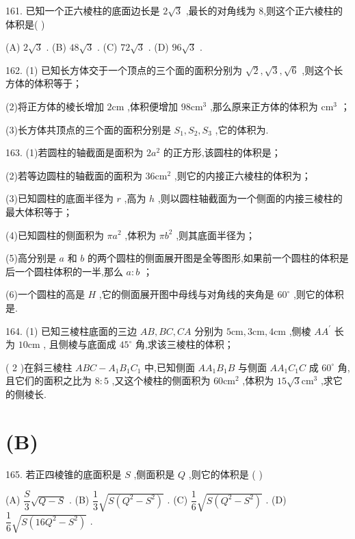 161. 已知一个正六棱柱的底面边长是 $2\sqrt{3}$ ,最长的对角线为 8,则这个正六棱柱的体积是(   )

(A) $2\sqrt{3}$ . (B) ${48}\sqrt{3}$ . (C) ${72}\sqrt{3}$ . (D) ${96}\sqrt{3}$ .

162. (1) 已知长方体交于一个顶点的三个面的面积分别为 $\sqrt{2},\sqrt{3},\sqrt{6}$ ,则这个长方体的体积等于\blkda{}；

(2)将正方体的棱长增加 $2\mathrm{{cm}}$ ,体积便增加 ${98}{\mathrm{{cm}}}^{3}$ ,那么原来正方体的体积为\blkda{} ${\mathrm{{cm}}}^{3}$ ；

(3)长方体共顶点的三个面的面积分别是 ${S}_{1},{S}_{2},{S}_{3}$ ,它的体积为\blkda{}.

163. (1)若圆柱的轴截面是面积为 $2{a}^{2}$ 的正方形,该圆柱的体积是\blkda{}；

(2)若等边圆柱的轴截面的面积为 ${36}{\mathrm{{cm}}}^{2}$ ,则它的内接正六棱柱的体积为\blkda{}；

(3)已知圆柱的底面半径为 $r$ ,高为 $h$ ,则以圆柱轴截面为一个侧面的内接三棱柱的最大体积等于\blkda{}；

(4)已知圆柱的侧面积为 $\pi {a}^{2}$ ,体积为 $\pi {b}^{2}$ ,则其底面半径为\blkda{}；

(5)高分别是 $a$ 和 $b$ 的两个圆柱的侧面展开图是全等图形,如果前一个圆柱的体积是后一个圆柱体积的一半,那么 $a : b$ \blkda{}；

(6)一个圆柱的高是 $H$ ,它的侧面展开图中母线与对角线的夹角是 ${60}^{ \circ  }$ ,则它的体积是\blkda{}.

164. (1) 已知三棱柱底面的三边 ${AB},{BC},{CA}$ 分别为 $5\mathrm{{cm}},3\mathrm{{cm}},4\mathrm{{cm}}$ ,侧棱 $A{A}^{\prime }$ 长为 ${10}\mathrm{{cm}}$ , 且侧棱与底面成 ${45}^{ \circ  }$ 角,求该三棱柱的体积；

( 2 )在斜三棱柱 ${ABC} - {A}_{1}{B}_{1}{C}_{1}$ 中,已知侧面 $A{A}_{1}{B}_{1}B$ 与侧面 $A{A}_{1}{C}_{1}C$ 成 ${60}^{ \circ  }$ 角,且它们的面积之比为 $8 : 5$ ,又这个棱柱的侧面积为 ${60}{\mathrm{{cm}}}^{2}$ ,体积为 ${15}\sqrt{3}{\mathrm{{cm}}}^{3}$ ,求它的侧棱长.

\section*{(B)}

165. 若正四棱锥的底面积是 $S$ ,侧面积是 $Q$ ,则它的体积是 (   )

(A) $\dfrac{S}{3}\sqrt{Q - S}$ . (B) $\dfrac{1}{3}\sqrt{S\left( {{Q}^{2} - {S}^{2}}\right) }$ . (C) $\dfrac{1}{6}\sqrt{S\left( {{Q}^{2} - {S}^{2}}\right) }$ . (D) $\dfrac{1}{6}\sqrt{S\left( {{16}{Q}^{2} - {S}^{2}}\right) }$ .

